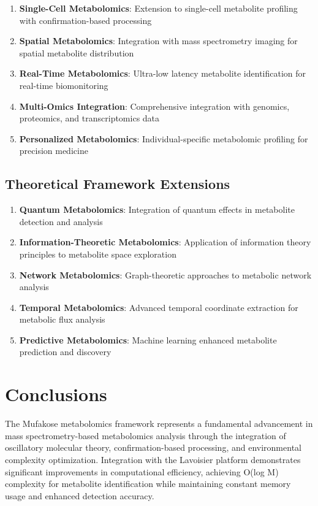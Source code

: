 \documentclass[12pt,a4paper]{article}
\begin{document}
\begin{enumerate}
\item \textbf{Single-Cell Metabolomics}: Extension to single-cell metabolite profiling with confirmation-based processing
\item \textbf{Spatial Metabolomics}: Integration with mass spectrometry imaging for spatial metabolite distribution
\item \textbf{Real-Time Metabolomics}: Ultra-low latency metabolite identification for real-time biomonitoring
\item \textbf{Multi-Omics Integration}: Comprehensive integration with genomics, proteomics, and transcriptomics data
\item \textbf{Personalized Metabolomics}: Individual-specific metabolomic profiling for precision medicine
\end{enumerate}

\subsection{Theoretical Framework Extensions}

\begin{enumerate}
\item \textbf{Quantum Metabolomics}: Integration of quantum effects in metabolite detection and analysis
\item \textbf{Information-Theoretic Metabolomics}: Application of information theory principles to metabolite space exploration
\item \textbf{Network Metabolomics}: Graph-theoretic approaches to metabolic network analysis
\item \textbf{Temporal Metabolomics}: Advanced temporal coordinate extraction for metabolic flux analysis
\item \textbf{Predictive Metabolomics}: Machine learning enhanced metabolite prediction and discovery
\end{enumerate}

\section{Conclusions}

The Mufakose metabolomics framework represents a fundamental advancement in mass spectrometry-based metabolomics analysis through the integration of oscillatory molecular theory, confirmation-based processing, and environmental complexity optimization. Integration with the Lavoisier platform demonstrates significant improvements in computational efficiency, achieving O(log M) complexity for metabolite identification while maintaining constant memory usage and enhanced detection accuracy.
\end{document}
